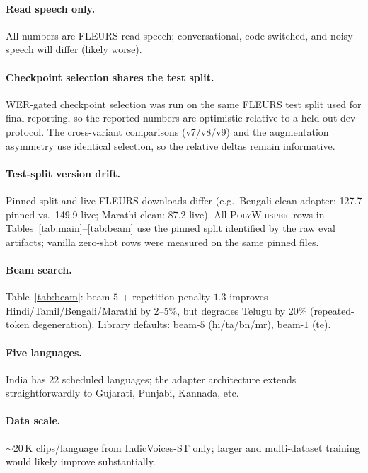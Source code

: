 \documentclass[11pt,a4paper]{article}
\newcommand{\poly}{\textsc{PolyWhisper}}
\begin{document}
\paragraph{Read speech only.}
All numbers are FLEURS read speech; conversational, code-switched, and noisy speech will differ (likely worse).

\paragraph{Checkpoint selection shares the test split.}
WER-gated checkpoint selection was run on the same FLEURS test split used for final reporting, so the reported numbers are optimistic relative to a held-out dev protocol. The cross-variant comparisons (v7/v8/v9) and the augmentation asymmetry use identical selection, so the relative deltas remain informative.

\paragraph{Test-split version drift.}
Pinned-split and live FLEURS downloads differ (e.g.\ Bengali clean adapter: 127.7 pinned vs.\ 149.9 live; Marathi clean: 87.2 live). All \poly\ rows in Tables~\ref{tab:main}--\ref{tab:beam} use the pinned split identified by the raw eval artifacts; vanilla zero-shot rows were measured on the same pinned files.

\paragraph{Beam search.}
Table~\ref{tab:beam}: beam-$5$ + repetition penalty $1.3$ improves
Hindi/Tamil/Bengali/Marathi by 2--5\%, but degrades Telugu by 20\%
(repeated-token degeneration).
Library defaults: beam-$5$ (hi/ta/bn/mr), beam-$1$ (te).

\paragraph{Five languages.}
India has 22 scheduled languages; the adapter architecture extends straightforwardly to Gujarati, Punjabi, Kannada, etc.

\paragraph{Data scale.}
$\sim$20\,K clips/language from IndicVoices-ST only; larger and multi-dataset training would likely improve substantially.
\end{document}

